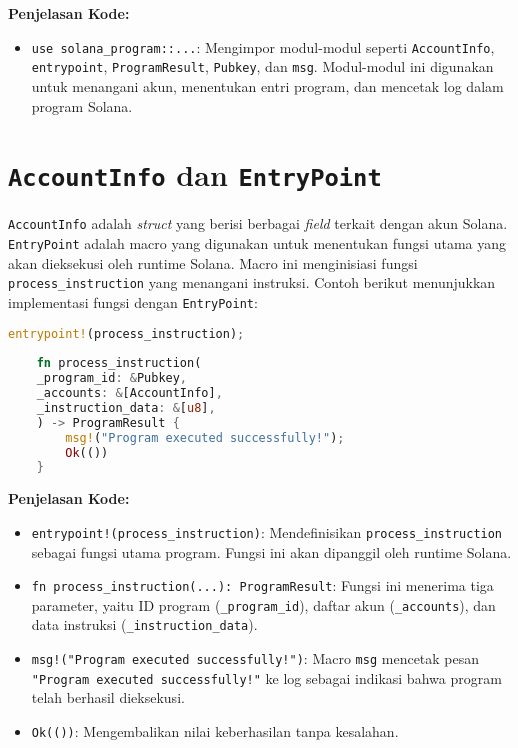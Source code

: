 \textbf{Penjelasan Kode:}
\begin{itemize}
	\item \texttt{use solana\_program::...}: Mengimpor modul-modul seperti \texttt{AccountInfo}, \texttt{entrypoint}, \texttt{ProgramResult}, \texttt{Pubkey}, dan \texttt{msg}. Modul-modul ini digunakan untuk menangani akun, menentukan entri program, dan mencetak log dalam program Solana.
\end{itemize}

\section{\texttt{AccountInfo} dan \texttt{EntryPoint}}

\texttt{AccountInfo} adalah \textit{struct} yang berisi berbagai \textit{field} terkait dengan akun Solana. \texttt{EntryPoint} adalah macro yang digunakan untuk menentukan fungsi utama yang akan dieksekusi oleh runtime Solana. Macro ini menginisiasi fungsi \texttt{process\_instruction} yang menangani instruksi. Contoh berikut menunjukkan implementasi fungsi dengan \texttt{EntryPoint}:

\begin{lstlisting}[language=Rust, caption={Implementasi EntryPoint dengan Fungsi \texttt{process\_instruction}}]
	entrypoint!(process_instruction);
	
	fn process_instruction(
	_program_id: &Pubkey,
	_accounts: &[AccountInfo],
	_instruction_data: &[u8],
	) -> ProgramResult {
		msg!("Program executed successfully!");
		Ok(())
	}
\end{lstlisting}

\textbf{Penjelasan Kode:}
\begin{itemize}
	\item \texttt{entrypoint!(process\_instruction)}: Mendefinisikan \texttt{process\_instruction} sebagai fungsi utama program. Fungsi ini akan dipanggil oleh runtime Solana.
	\item \texttt{fn process\_instruction(...): ProgramResult}: Fungsi ini menerima tiga parameter, yaitu ID program (\texttt{\_program\_id}), daftar akun (\texttt{\_accounts}), dan data instruksi (\texttt{\_instruction\_data}).
	\item \texttt{msg!("Program executed successfully!")}: Macro \texttt{msg} mencetak pesan \texttt{"Program executed successfully!"} ke log sebagai indikasi bahwa program telah berhasil dieksekusi.
	\item \texttt{Ok(())}: Mengembalikan nilai keberhasilan tanpa kesalahan.
\end{itemize}

